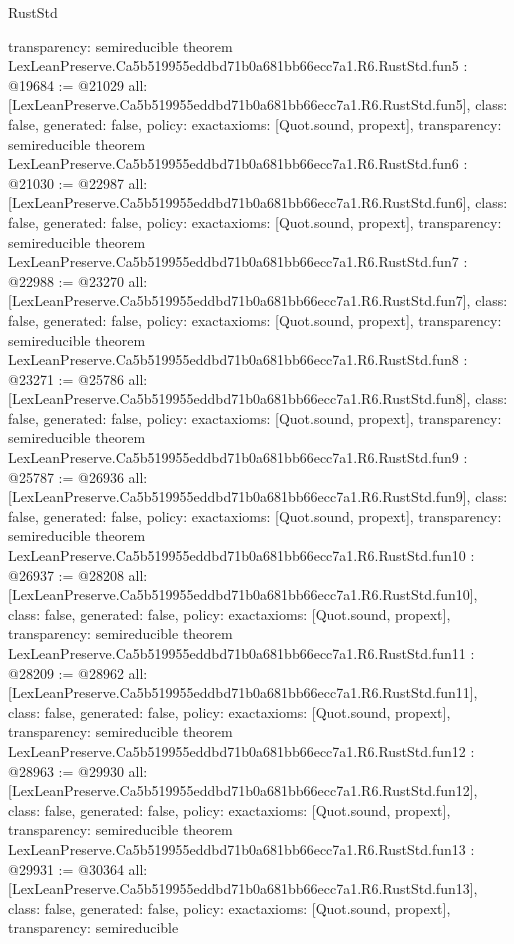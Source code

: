 \begin{lexlean}{RustStd}
\begin{coremodule}
{  transparency: semireducible
}
theorem LexLeanPreserve.Ca5b519955eddbd71b0a681bb66ecc7a1.R6.RustStd.fun5 : @19684 := @21029 {
  all: [LexLeanPreserve.Ca5b519955eddbd71b0a681bb66ecc7a1.R6.RustStd.fun5],
  class: false,
  generated: false,
  policy: exact{axioms: [Quot.sound, propext]},
  transparency: semireducible
}
theorem LexLeanPreserve.Ca5b519955eddbd71b0a681bb66ecc7a1.R6.RustStd.fun6 : @21030 := @22987 {
  all: [LexLeanPreserve.Ca5b519955eddbd71b0a681bb66ecc7a1.R6.RustStd.fun6],
  class: false,
  generated: false,
  policy: exact{axioms: [Quot.sound, propext]},
  transparency: semireducible
}
theorem LexLeanPreserve.Ca5b519955eddbd71b0a681bb66ecc7a1.R6.RustStd.fun7 : @22988 := @23270 {
  all: [LexLeanPreserve.Ca5b519955eddbd71b0a681bb66ecc7a1.R6.RustStd.fun7],
  class: false,
  generated: false,
  policy: exact{axioms: [Quot.sound, propext]},
  transparency: semireducible
}
theorem LexLeanPreserve.Ca5b519955eddbd71b0a681bb66ecc7a1.R6.RustStd.fun8 : @23271 := @25786 {
  all: [LexLeanPreserve.Ca5b519955eddbd71b0a681bb66ecc7a1.R6.RustStd.fun8],
  class: false,
  generated: false,
  policy: exact{axioms: [Quot.sound, propext]},
  transparency: semireducible
}
theorem LexLeanPreserve.Ca5b519955eddbd71b0a681bb66ecc7a1.R6.RustStd.fun9 : @25787 := @26936 {
  all: [LexLeanPreserve.Ca5b519955eddbd71b0a681bb66ecc7a1.R6.RustStd.fun9],
  class: false,
  generated: false,
  policy: exact{axioms: [Quot.sound, propext]},
  transparency: semireducible
}
theorem LexLeanPreserve.Ca5b519955eddbd71b0a681bb66ecc7a1.R6.RustStd.fun10 : @26937 := @28208 {
  all: [LexLeanPreserve.Ca5b519955eddbd71b0a681bb66ecc7a1.R6.RustStd.fun10],
  class: false,
  generated: false,
  policy: exact{axioms: [Quot.sound, propext]},
  transparency: semireducible
}
theorem LexLeanPreserve.Ca5b519955eddbd71b0a681bb66ecc7a1.R6.RustStd.fun11 : @28209 := @28962 {
  all: [LexLeanPreserve.Ca5b519955eddbd71b0a681bb66ecc7a1.R6.RustStd.fun11],
  class: false,
  generated: false,
  policy: exact{axioms: [Quot.sound, propext]},
  transparency: semireducible
}
theorem LexLeanPreserve.Ca5b519955eddbd71b0a681bb66ecc7a1.R6.RustStd.fun12 : @28963 := @29930 {
  all: [LexLeanPreserve.Ca5b519955eddbd71b0a681bb66ecc7a1.R6.RustStd.fun12],
  class: false,
  generated: false,
  policy: exact{axioms: [Quot.sound, propext]},
  transparency: semireducible
}
theorem LexLeanPreserve.Ca5b519955eddbd71b0a681bb66ecc7a1.R6.RustStd.fun13 : @29931 := @30364 {
  all: [LexLeanPreserve.Ca5b519955eddbd71b0a681bb66ecc7a1.R6.RustStd.fun13],
  class: false,
  generated: false,
  policy: exact{axioms: [Quot.sound, propext]},
  transparency: semireducible
}
\end{coremodule}
\end{lexlean}
